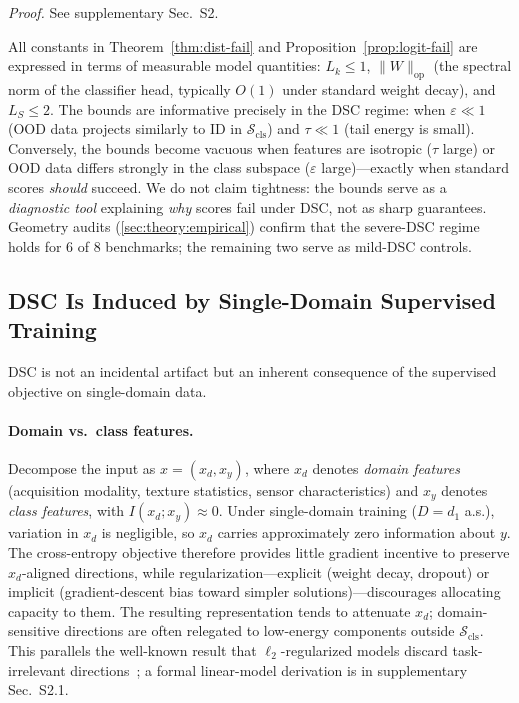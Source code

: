 \documentclass[runningheads]{llncs}
\begin{document}
\noindent\emph{Proof.} See supplementary Sec.~S2.

\begin{remark}\label{rem:tightness}
All constants in Theorem~\ref{thm:dist-fail} and Proposition~\ref{prop:logit-fail} are expressed in terms of measurable model quantities: $L_k \le 1$, $\|W\|_{\mathrm{op}}$ (the spectral norm of the classifier head, typically $O(1)$ under standard weight decay), and $L_S \le 2$.
The bounds are informative precisely in the DSC regime: when $\varepsilon \ll 1$ (OOD data projects similarly to ID in $\mathcal{S}_{\mathrm{cls}}$) and $\tau \ll 1$ (tail energy is small).
Conversely, the bounds become vacuous when features are isotropic ($\tau$ large) or OOD data differs strongly in the class subspace ($\varepsilon$ large)---exactly when standard scores \emph{should} succeed.
We do not claim tightness: the bounds serve as a \emph{diagnostic tool} explaining \emph{why} scores fail under DSC, not as sharp guarantees.
Geometry audits (\cref{sec:theory:empirical}) confirm that the severe-DSC regime holds for 6 of 8 benchmarks; the remaining two serve as mild-DSC controls.
\end{remark}

\subsection{DSC Is Induced by Single-Domain Supervised Training}
\label{sec:theory:cause}

DSC is not an incidental artifact but an inherent consequence of the supervised objective on single-domain data.

\paragraph{Domain vs.\ class features.}
Decompose the input as $x = (x_d, x_y)$, where $x_d$ denotes \emph{domain features} (acquisition modality, texture statistics, sensor characteristics) and $x_y$ denotes \emph{class features}, with $I(x_d; x_y) \approx 0$.
Under single-domain training ($D{=}d_1$ a.s.), variation in $x_d$ is negligible, so $x_d$ carries approximately zero information about $y$.
The cross-entropy objective therefore provides little gradient incentive to preserve $x_d$-aligned directions, while regularization---explicit (weight decay, dropout) or implicit (gradient-descent bias toward simpler solutions)---discourages allocating capacity to them.
The resulting representation tends to attenuate $x_d$; domain-sensitive directions are often relegated to low-energy components outside $\mathcal{S}_{\mathrm{cls}}$.
This parallels the well-known result that $\ell_2$-regularized models discard task-irrelevant directions~\cite{Jing2022rank}; a formal linear-model derivation is in supplementary Sec.~S2.1.
\end{document}
